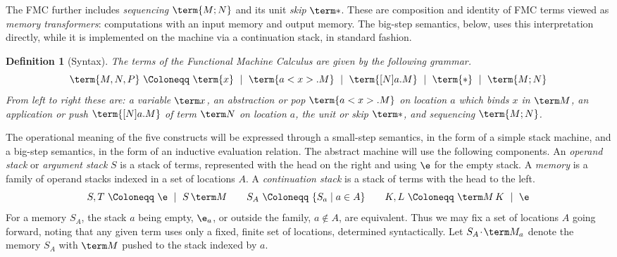 \documentclass[10pt,a4paper]{amsart}
\newtheorem{definition}[theorem]{Definition}
\newcommand\msep{\kern1pt{\cdot}\kern1pt}
\begin{document}
The FMC further includes \emph{sequencing} $\term{M;N}$ and its unit \emph{skip} $\term*$. These are composition and identity of FMC terms viewed as \emph{memory transformers}: computations with an input memory and output memory. The big-step semantics, below, uses this interpretation directly, while it is implemented on the machine  via a continuation stack, in standard fashion. 

\begin{definition}[Syntax]
The \emph{terms} of the Functional Machine Calculus are given by the following grammar.
\[
	\term{M,N,P}~\Coloneqq~
		\term{x}
~\mid~	\term{a<x>.M}
~\mid~	\term{[N]a.M}
~\mid~	\term{*}
~\mid~	\term{M;N}	
\]
From left to right these are: a \emph{variable} $\term x$, an \emph{abstraction} or \emph{pop} $\term{a<x>.M}$ on location $a$ which binds $x$ in $\term M$, an \emph{application} or \emph{push} $\term{[N]a.M}$ of term $\term N$ on location $a$, the \emph{unit} or \emph{skip} $\term*$, and \emph{sequencing} $\term{M;N}$.
\end{definition}

The operational meaning of the five constructs will be expressed through a small-step semantics, in the form of a simple stack machine, and a big-step semantics, in the form of an inductive evaluation relation. The abstract machine will use the following components. An \emph{operand stack} or \emph{argument stack} $S$ is a stack of terms, represented with the head on the right and using $\e$ for the empty stack. A \emph{memory} is a family of operand stacks indexed in a set of locations $A$. A \emph{continuation stack} is a stack of terms with the head to the left.
\[
	S,T~\Coloneqq~\e~\mid~S\,\term M
\qquad
	S_A~\Coloneqq~\{S_a\mid a\in A\}
\qquad
	K,L~\Coloneqq~\term M\,K~\mid~\e
\]
For a memory $S_A$, the stack $a$ being empty, $\e_a$, or outside the family, $a\notin A$, are equivalent. Thus we may fix a set of locations $A$ going forward, noting that any given term uses only a fixed, finite set of locations, determined syntactically. Let $S_A\msep\term M_a$ denote the memory $S_A$ with $\term M$ pushed to the stack indexed by $a$.
\end{document}
